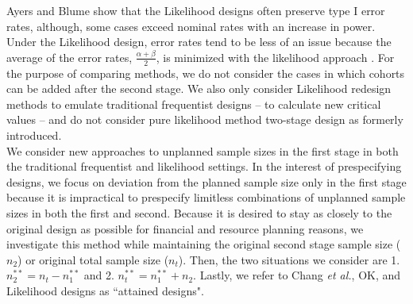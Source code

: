 \documentclass[12pt]{report}\usepackage[]{graphicx}\usepackage[]{color}
\newlength{\li}\setlength{\li}{14.48pt}
\newlength{\di}\setlength{\di}{-3.5mm}
\begin{document}
 
\indent Ayers and Blume \cite{Ayers} show that the Likelihood designs often preserve type I error rates, although, some cases exceed nominal rates with an increase in power. Under the Likelihood design, error rates tend to be less of an issue because the average of the error rates, $\frac{\alpha + \beta}{2}$, is minimized with the likelihood approach \cite{Ayers}. For the purpose of comparing methods, we do not consider the cases in which cohorts can be added after the second stage. We also only consider Likelihood redesign methods to emulate traditional frequentist designs -- to calculate new critical values -- and do not consider pure likelihood method two-stage design as formerly introduced. \\
\indent We consider new approaches to unplanned sample sizes in the first stage in both the traditional frequentist and likelihood settings. In the interest of prespecifying designs, we focus on deviation from the planned sample size only in the first stage because it is impractical to prespecify limitless combinations of unplanned sample sizes in both the first and second. Because it is desired to stay as closely to the original design as possible for financial and resource planning reasons, we investigate this method while maintaining the original second stage sample size ($n_2$) or original total sample size ($n_t$). Then, the two situations we consider are 1. $n_2^{\ast\ast} = n_t - n_1^{\ast\ast}$ and 2. $n_t^{\ast\ast} = n_1^{\ast\ast} + n_2$. Lastly, we refer to Chang \textit{et al.}, OK, and Likelihood designs as ``attained designs".
\end{document}
